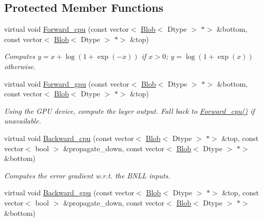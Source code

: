 \subsection*{Protected Member Functions}
\begin{DoxyCompactItemize}
\item 
virtual void \mbox{\hyperlink{classcaffe_1_1_b_n_l_l_layer_ad85abcd4d6afd609be859f0360525102}{Forward\+\_\+cpu}} (const vector$<$ \mbox{\hyperlink{classcaffe_1_1_blob}{Blob}}$<$ Dtype $>$ $\ast$$>$ \&bottom, const vector$<$ \mbox{\hyperlink{classcaffe_1_1_blob}{Blob}}$<$ Dtype $>$ $\ast$$>$ \&top)
\begin{DoxyCompactList}\small\item\em Computes $ y = x + \log(1 + \exp(-x)) $ if $ x > 0 $; $ y = \log(1 + \exp(x)) $ otherwise. \end{DoxyCompactList}\item 
\mbox{\label{classcaffe_1_1_b_n_l_l_layer_a1bc9ed3e2ea19df546e070975ddee29b}} 
virtual void \mbox{\hyperlink{classcaffe_1_1_b_n_l_l_layer_a1bc9ed3e2ea19df546e070975ddee29b}{Forward\+\_\+gpu}} (const vector$<$ \mbox{\hyperlink{classcaffe_1_1_blob}{Blob}}$<$ Dtype $>$ $\ast$$>$ \&bottom, const vector$<$ \mbox{\hyperlink{classcaffe_1_1_blob}{Blob}}$<$ Dtype $>$ $\ast$$>$ \&top)
\begin{DoxyCompactList}\small\item\em Using the G\+PU device, compute the layer output. Fall back to \mbox{\hyperlink{classcaffe_1_1_b_n_l_l_layer_ad85abcd4d6afd609be859f0360525102}{Forward\+\_\+cpu()}} if unavailable. \end{DoxyCompactList}\item 
virtual void \mbox{\hyperlink{classcaffe_1_1_b_n_l_l_layer_a014a52e7ba756d94d2af865dc6c855dc}{Backward\+\_\+cpu}} (const vector$<$ \mbox{\hyperlink{classcaffe_1_1_blob}{Blob}}$<$ Dtype $>$ $\ast$$>$ \&top, const vector$<$ bool $>$ \&propagate\+\_\+down, const vector$<$ \mbox{\hyperlink{classcaffe_1_1_blob}{Blob}}$<$ Dtype $>$ $\ast$$>$ \&bottom)
\begin{DoxyCompactList}\small\item\em Computes the error gradient w.\+r.\+t. the B\+N\+LL inputs. \end{DoxyCompactList}\item 
\mbox{\label{classcaffe_1_1_b_n_l_l_layer_ac8a7f10b887b59194694f14e887fc6a6}} 
virtual void \mbox{\hyperlink{classcaffe_1_1_b_n_l_l_layer_ac8a7f10b887b59194694f14e887fc6a6}{Backward\+\_\+gpu}} (const vector$<$ \mbox{\hyperlink{classcaffe_1_1_blob}{Blob}}$<$ Dtype $>$ $\ast$$>$ \&top, const vector$<$ bool $>$ \&propagate\+\_\+down, const vector$<$ \mbox{\hyperlink{classcaffe_1_1_blob}{Blob}}$<$ Dtype $>$ $\ast$$>$ \&bottom)

\end{DoxyCompactItemize}
